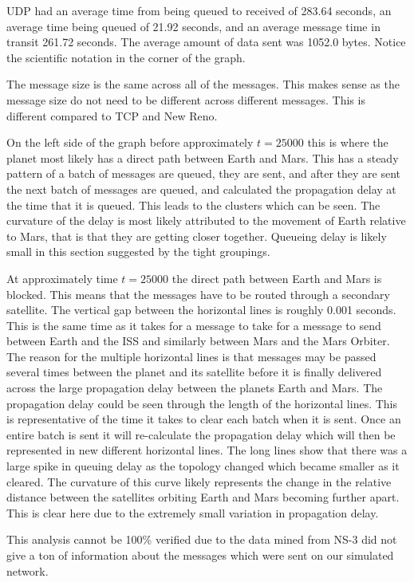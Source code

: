 \documentclass[a4paper,12pt]{article}
\begin{document}
UDP had an average time from being queued to received of 283.64 seconds, an
average time being queued of 21.92 seconds, and an average message time in
transit 261.72 seconds. The average amount of data sent was 1052.0 bytes. Notice
the scientific notation in the corner of the graph.

The message size is the same across all of the messages. This makes sense as the message size do not need to be different across different messages. This is different compared to TCP and New Reno.

On the left side of the graph before approximately $t = 25000$ this is where
the planet most likely has a direct path between Earth and Mars. This has a
steady pattern of a batch of messages are queued, they are sent, and after they
are sent the next batch of messages are queued, and calculated the propagation
delay at the time that it is queued. This leads to the clusters which can be seen.
The curvature of the delay is most likely attributed to the movement of Earth
relative to Mars, that is that they are getting closer together. Queueing delay is likely small in this section suggested by the tight groupings.

At approximately time $t = 25000$ the direct path between Earth and Mars is
blocked. This means that the messages have to be routed through a secondary
satellite. The vertical gap between the horizontal lines is roughly 0.001
seconds. This is the same time as it takes for a message to take for a message
to send between Earth and the ISS and similarly between Mars and the Mars
Orbiter. The reason for the multiple horizontal lines is that messages may be
passed several times between the planet and its satellite before it is finally
delivered across the large propagation delay between the planets Earth and Mars.
The propagation delay could be seen through the length of the horizontal lines.
This is representative of the time it takes to clear each batch when it is sent.
Once an entire batch is sent it will re-calculate the propagation delay which
will then be represented in new different horizontal lines. The long lines show
that there was a large spike in queuing delay as the topology changed which
became smaller as it cleared. The curvature of this curve likely represents the
change in the relative distance between the satellites orbiting Earth and Mars
becoming further apart. This is clear here due to the extremely small variation
in propagation delay.

This analysis cannot be 100\% verified due to the data mined from NS-3 did not give a ton of information about the messages which were sent on our simulated network.
\end{document}
